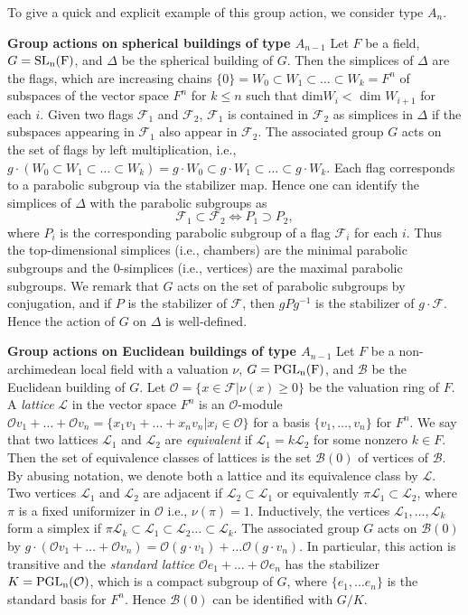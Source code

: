 \documentclass[letterpaper, reqno, 11pt]{amsart}
\theoremstyle{definition}
\theoremstyle{definition}
\theoremstyle{remark}
\newcommand{\cal}{\mathcal}
\begin{document}
To give a quick and explicit example of this group action, we consider type $A_n$.

\medskip
\textbf{Group actions on spherical buildings of type $A_{n-1}$}
Let $F$ be a field, $G=\rm{SL}_n(F)$, and $\Delta$ be the spherical building of $G$. Then the simplices of $\Delta$ are the flags, which are increasing chains $\{0\}=W_0 \subset W_1 \subset \dots \subset W_k=F^n$ of subspaces of the vector space $F^n$ for $k \leq n$ such that dim$W_i <$ dim $W_{i+1}$ for each $i$. 
Given two flags $\cal{F}_1$ and $\cal{F}_2$, 
$\cal{F}_1$ is contained in $\cal{F}_2$ as simplices in $\Delta$ if the subspaces appearing in $\cal{F}_1$ also appear in $\cal{F}_2$. 
The associated group $G$ acts on the set of flags by left multiplication, i.e., 
$g \cdot (W_0 \subset W_1 \subset \dots \subset W_k)=g \cdot W_0 \subset g \cdot W_1 \subset \dots \subset g \cdot W_k $.
Each flag corresponds to a parabolic subgroup via the stabilizer map. Hence one can identify the simplices of $\Delta$ with the parabolic subgroups as
$$
\cal{F}_1 \subset \cal{F}_2 \Longleftrightarrow
P_1 \supset P_2,
$$
where $P_i$ is the corresponding parabolic subgroup of a flag $\cal{F}_i$ for each $i$.
Thus the top-dimensional simplices (i.e., chambers) are the minimal parabolic subgroups and the $0$-simplices (i.e., vertices) are the maximal parabolic subgroups.
We remark that $G$ acts on the set of parabolic subgroups by conjugation, and if $P$ is the stabilizer of $\cal{F}$, then $gPg^{-1}$ is the stabilizer of $g \cdot\cal{F}$. Hence the action of $G$ on $\Delta$ is well-defined.


\medskip
\textbf{Group actions on Euclidean buildings of type $A_{n-1}$}
Let $F$ be a non-archimedean local field with a valuation $\nu$, $G=\rm{PGL}_n(F)$, and $\cal{B}$ be the Euclidean building of $G$.
Let $\cal{O}=\{x \in  \cal{F} | \nu(x) \geq 0 \}$ be the valuation ring of $F$. 
A \textit{lattice} $\cal{L}$ in the vector space $F^n$ is an $\cal{O}$-module $\cal{O}v_1+ \dots +\cal{O}v_n=\{x_1v_1+\dots+x_nv_n|x_i \in \cal{O}\}$ for a basis $\{v_1, \dots, v_n\}$ for $F^n$. We say that two lattices $\cal{L}_1$ and $\cal{L}_2$ are \textit{equivalent} if $\cal{L}_1=k\cal{L}_2$ for some nonzero $k\in F$. Then the set of equivalence classes of lattices is the set $\cal{B}(0)$ of vertices of $\cal{B}$. By abusing notation, we denote both a lattice and its equivalence class by $\cal{L}$. Two vertices $\cal{L}_1$ and $\cal{L}_2$ are adjacent if 
$\cal{L}_2 \subset \cal{L}_1$ or equivalently  $\pi \cal{L}_1 \subset \cal{L}_2$, where $\pi$ is a fixed uniformizer in $\cal{O}$ i.e., $\nu(\pi)=1$. Inductively, the vertices $\cal{L}_1, \dots, \cal{L}_k$ form a simplex if $\pi \cal{L}_k \subset \cal{L}_1 \subset \cal{L}_2 \dots \subset \cal{L}_k$.
The associated group $G$ acts on $\cal{B}(0)$ by 
$g \cdot (\cal{O}v_1+ \dots +\cal{O}v_n)=\cal{O}(g \cdot v_1)+ \dots \cal{O} (g \cdot v_n)$. In particular, this action is transitive and the \textit{standard lattice} $\cal{O}e_1+ \dots +\cal{O}e_n$ has the stabilizer $K=\rm{PGL}_n(\cal{O})$, which is a compact subgroup of $G$, where $\{e_1, \dots e_n\}$ is the standard basis for $F^n$.
Hence $\cal{B}(0)$ can be identified with $G/K$.    
\end{document}
